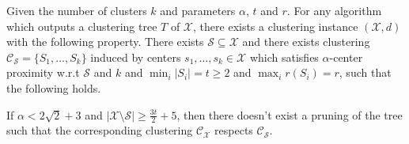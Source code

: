 \documentclass[anon,12pt]{colt2016} %
\newcommand{\mc}{\mathcal}
\begin{document}
\begin{theorem}
\label{thm:nosparsealg}
Given the number of clusters $k$ and parameters $\alpha$, $t$ and $r$. For any algorithm which outputs a clustering tree $T$ of $\mc X$, there exists a clustering instance $(\mc X, d)$ with the following property. There exists $\mc S \subseteq \mc X$ and there exists clustering $\mc C_{\mc S} = \{S_1, \ldots, S_k\}$ induced by centers $s_1, \ldots, s_k \in \mc X$ which satisfies $\alpha$-center proximity w.r.t $\mc S$ and $k$ and $ \min_i|S_i| = t \ge 2$ and $\max_i r(S_i) = r$, such that the following holds. 

If $\alpha < 2\sqrt 2 + 3$ and $|\mc X \setminus \mc S| \ge \frac{3t}{2}+5$, then there doesn't exist a pruning of the tree such that the corresponding clustering $\mc C_{\mc X}$ respects $\mc C_{\mc S}$.
\end{theorem}
\end{document}
